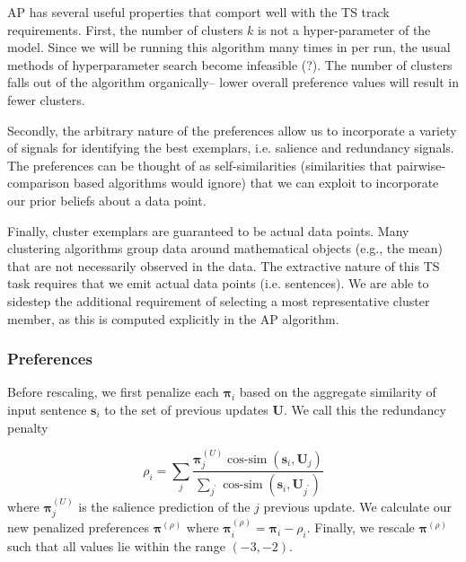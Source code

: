 AP has several useful properties that comport well with the TS track 
requirements. First, the number of clusters $k$ is not a hyper-parameter
of the model. Since we will be running this algorithm many times in per run,
the usual methods of hyperparameter search become infeasible 
(?). The number of clusters falls out of the algorithm
organically-- lower overall preference values will result in fewer clusters. 

Secondly, the arbitrary nature of the preferences
allow us to incorporate a variety of signals for
identifying the best exemplars, i.e. salience and redundancy signals. 
The preferences can be thought of as self-similarities (similarities that
pairwise-comparison based algorithms would ignore) that we can exploit to 
incorporate our prior beliefs about a data point.

Finally, cluster exemplars are guaranteed to be actual data points. Many 
clustering algorithms group data around mathematical objects (e.g., the
mean) that are not necessarily observed in the data. The extractive nature of
this TS task requires that we emit actual data points (i.e. sentences).
We are able to sidestep 
the additional requirement of selecting a most
representative cluster member, as this is computed explicitly in the AP 
algorithm. 

\subsubsection{Preferences}

Before rescaling, we first penalize each $\boldsymbol{\pi}_i$ based on
the aggregate similarity of input sentence $\mathbf{s}_i$ to the set of previous updates
$\mathbf{U}$. We call this the redundancy penalty 

$$\rho_i = \sum_j \frac{\boldsymbol{\pi}^{(U)}_{j}\operatorname{cos-sim}(\mathbf{s}_i, \mathbf{U}_j)}
{\sum_{j^\prime}\operatorname{cos-sim}(\mathbf{s}_i, \mathbf{U}_{j^\prime})} $$   
where $\boldsymbol{\pi}^{(U)}_{j}$ is the salience prediction of the $j$ 
previous update. We calculate our new penalized preferences 
$\boldsymbol{\pi}^{(\rho)}$ where $\boldsymbol{\pi}^{(\rho)}_i = \boldsymbol{\pi}_i - \rho_i$.
Finally, we rescale $\boldsymbol{\pi}^{(\rho)}$ such that all values lie 
within the range $(-3,-2)$.

